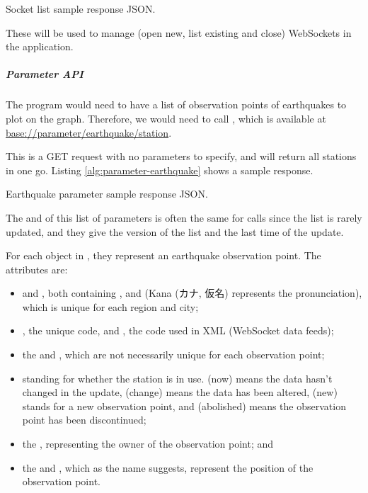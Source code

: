 \begin{listing}[!ht]
    \caption{Socket list sample response JSON.}
    \label{alg:socket-list}
\end{listing}

These will be used to manage (open new, list existing and close) WebSockets in the application.

\subparagraph{Parameter API}

The program would need to have a list of observation points of earthquakes to plot on the graph. Therefore, we would need to call , which is available at \url{base://parameter/earthquake/station}.

This is a GET request with no parameters to specify, and will return all stations in one go. Listing \ref{alg:parameter-earthquake} shows a sample response.

\begin{listing}[!ht]
    \caption{Earthquake parameter sample response JSON.}
    \label{alg:parameter-earthquake}
\end{listing}

The  and  of this list of parameters is often the same for calls since the list is rarely updated, and they give the version of the list and the last time of the update.

For each object in , they represent an earthquake observation point. The attributes are:
\begin{itemize}
    \item {} and , both containing ,  and  (Kana (カナ, 仮名) represents the pronunciation), which is unique for each region and city;
    \item {}, the unique code, and , the code used in XML (WebSocket data feeds);
    \item the  and , which are not necessarily unique for each observation point;
    \item {} standing for whether the station is in use.  (now) means the data hasn't changed in the update,  (change) means the data has been altered,  (new) stands for a new observation point, and  (abolished) means the observation point has been discontinued;
    \item the , representing the owner of the observation point; and
    \item the  and , which as the name suggests, represent the position of the observation point.
\end{itemize}

